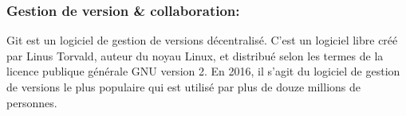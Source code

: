 \subsubsection{Gestion de version \& collaboration:}
\begin{minipage}{0.2\textwidth}
	\begin{minipage}{\linewidth}
			\label{f3}%
	\end{minipage}
\end{minipage}
\hfill
\begin{minipage}{0.75\textwidth}
	Git est un logiciel de gestion de versions décentralisé. C'est un logiciel libre créé par Linus Torvald, auteur du noyau Linux, et distribué selon les termes de la licence publique générale GNU version 2. En 2016, il s’agit du logiciel de gestion de versions le plus populaire qui est utilisé par plus de douze millions de personnes.\\
\end{minipage}\\

